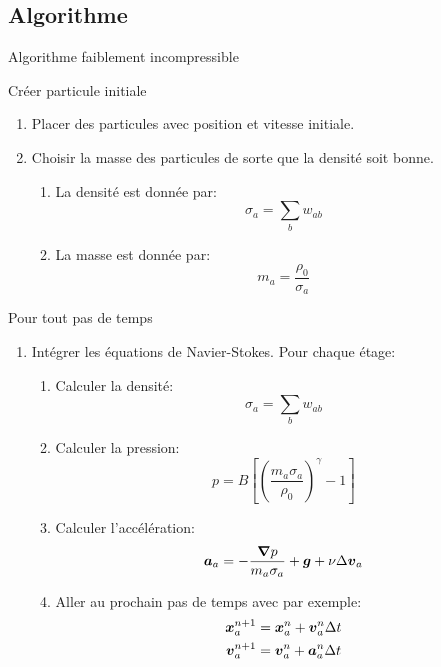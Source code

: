 \subsection{Algorithme}
\begin{frame}[<+->][shrink]{Algorithme faiblement incompressible}
\begin{block}{Créer particule initiale}
	\begin{enumerate}
		\item<+-> Placer des particules avec position et vitesse initiale.
		\item<+-> Choisir la masse des particules de sorte que la densité soit bonne.
		\begin{enumerate}
			\item La densité est donnée par:
			\begin{equation*}
			\sigma_{a}=\sum_{b}w_{ab}
			\end{equation*}
			\item La masse est donnée par:
			\begin{equation*}
			m_a=\frac{\rho_{0}}{\sigma_{a}}
			\end{equation*}
		\end{enumerate}
	\end{enumerate}
\end{block}
\begin{block}{Pour tout pas de temps}
	\begin{enumerate}
		\item Intégrer les équations de Navier-Stokes. Pour chaque étage:
		\begin{enumerate}
			\item Calculer la densité:
			\begin{equation*}
			\sigma_{a}=\sum_{b}w_{ab}
			\end{equation*}
			\item Calculer la pression:
			\begin{equation*}
			p=B \left[\left(\frac{m_{a}\sigma_{a}}{\rho_{0}}\right)^{\gamma}-1\right]
			\end{equation*}
			\item Calculer l'accélération:
			\begin{equation*}
			{\boldsymbol {a}}_a=-\frac{{\boldsymbol {\nabla}} p}{m_{a}\sigma_{a}}+{\boldsymbol {g}}+\nu \Delta {\boldsymbol {v}}_{a}
			\end{equation*}
			\item Aller au prochain pas de temps avec par exemple:
			\begin{align*}
			{\boldsymbol {x}}^{n+1}_{a}&={\boldsymbol {x}}^{n}_{a}+{\boldsymbol {v}}^{n}_a\Delta t\\
			{\boldsymbol {v}}^{n+1}_{a}&={\boldsymbol {v}}^{n}_{a}+{\boldsymbol {a}}^{n}_{a}\Delta t
			\end{align*}
		\end{enumerate}
	\end{enumerate}
\end{block}
\end{frame}
 
